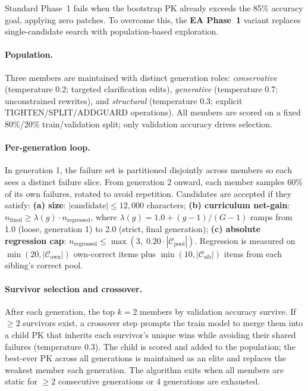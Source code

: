 \documentclass{article}
\begin{document}
Standard Phase~1 fails when the bootstrap PK already exceeds the 85\% accuracy goal,
applying zero patches.
To overcome this, the \textbf{EA Phase~1} variant replaces single-candidate search with
population-based exploration.

\paragraph{Population.}
Three members are maintained with distinct generation roles:
\emph{conservative} (temperature 0.2; targeted clarification edits),
\emph{generative} (temperature 0.7; unconstrained rewrites),
and \emph{structural} (temperature 0.3; explicit TIGHTEN/SPLIT/ADD\textunderscore GUARD
operations).
All members are scored on a fixed 80\%/20\% train/validation split;
only validation accuracy drives selection.

\paragraph{Per-generation loop.}
In generation 1, the failure set is partitioned disjointly across members so each sees a
distinct failure slice.
From generation 2 onward, each member samples $60\%$ of its own failures, rotated to
avoid repetition.
Candidates are accepted if they satisfy:
\textbf{(a) size}: $|\text{candidate}| \leq 12{,}000$ characters;
\textbf{(b) curriculum net-gain}: $n_\text{fixed} \geq \lambda(g) \cdot n_\text{regressed}$,
where $\lambda(g) = 1.0 + (g-1)/(G-1)$ ramps from 1.0 (loose, generation 1) to 2.0
(strict, final generation);
\textbf{(c) absolute regression cap}: $n_\text{regressed} \leq \max\!\left(3,\;
0.20 \cdot |\mathcal{C}_\text{pool}|\right)$.
Regression is measured on $\min(20,|\mathcal{C}_\text{own}|)$ own-correct items plus
$\min(10,|\mathcal{C}_\text{sib}|)$ items from each sibling's correct pool.

\paragraph{Survivor selection and crossover.}
After each generation, the top $k=2$ members by validation accuracy survive.
If $\geq 2$ survivors exist, a crossover step prompts the train model to merge them into a
child PK that inherits each survivor's unique wins while avoiding their shared failures
(temperature 0.3).
The child is scored and added to the population; the best-ever PK across all generations is
maintained as an elite and replaces the weakest member each generation.
The algorithm exits when all members are static for $\geq 2$ consecutive generations or
4 generations are exhausted.
\end{document}
